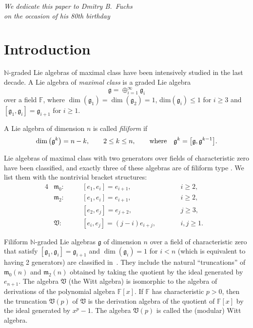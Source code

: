 \documentclass[pdftex]{sigma}
\def\g{\mathfrak g}
\def\m{\mathfrak m}
\def\V{\mathfrak V}
\def\F{\mathbb F}
\def\N{\mathbb N}
\numberwithin{equation}{section}
\begin{document}

\begin{flushright}\begin{minipage}{70mm}
\it We dedicate this paper to Dmitry B.~Fuchs\\ on the occasion of his 80th birthday
\end{minipage}
\end{flushright}

\renewcommand{\thefootnote}{\arabic{footnote}}
\setcounter{footnote}{0}

\section{Introduction}
$\N$-graded Lie algebras of maximal class have been intensively studied in the last decade. A Lie algebra of \emph{maximal class} is
a graded Lie algebra
\[
 \g=\oplus_{i=1}^{\infty}\g_i
\]
over a field $\F$, where $\dim(\g_1)=\dim(\g_2)=1$, dim$(\g_i) \leq 1$
for $i \ge 3$ and $[\g_1,\g_i]= \g_{i+1}$ for $i \ge 1$.

A Lie algebra of dimension $n$ is called \emph{filiform} if
\[\dim\big(\g^k\big)=n-k,\qquad 2 \le k \le n,\qquad {\rm where} \quad \g^k=\big[\g,\g^{k-1}\big].\]

Lie algebras of maximal class with two generators over fields of characteristic zero have been classified, and exactly three of these algebras are of filiform type \cite{Fialowski1983}. We list them with the nontrivial bracket structures:
\begin{alignat*}{4}
& \m_0\colon \quad&& [e_1 ,e_i]= e_{i+1}, \qquad && i \ge 2,&\\
& \m_2\colon \quad&& [e_1, e_i]= e_{i+1}, \qquad && i \ge 2,&\\
&&& [e_2, e_j] = e_{j+2}, \qquad && j \ge 3, &\\
& \V\colon \quad && [e_i, e_j] = (j-i)e_{i+j}, \qquad && i, j \ge 1.&
\end{alignat*}

Filiform $\N$-graded Lie algebras $\g$ of dimension $n$ over a field of characteristic zero that satisfy $[\g_1,\g_i]=\g_{i+1}$ and $\dim(\g_i)=1$ for $i<n$ (which is equivalent to having 2 generators) are classified in~\cite{Millionschikov2004}. They include the natural ``truncations'' of $\m_0(n)$ and $\m_2(n)$ obtained by taking the quotient by the ideal generated by $e_{n+1}$. The algebra $\V$ (the Witt algebra) is isomorphic to the algebra of derivations of the polynomial algebra $\F[x]$. If $\F$ has characteristic $p>0$, then the truncation $\V(p)$ of $\V$ is the derivation algebra of the quotient of $\F[x]$ by the ideal generated by $x^p-1$. The algebra $\V(p)$ is called the (modular) Witt algebra.
\end{document}
